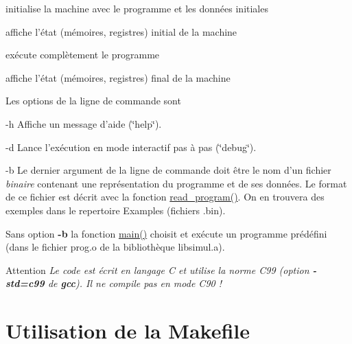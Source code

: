\begin{DoxyDescription}
\begin{DoxyItemize}
\item initialise la machine avec le programme et les données initiales


\item affiche l'état (mémoires, registres) initial de la machine


\item exécute complètement le programme


\item affiche l'état (mémoires, registres) final de la machine 
\end{DoxyItemize}

\-Les options de la ligne de commande sont 
\begin{DoxyDescription}
\item[-\/h ]\-Affiche un message d'aide (\char`\"{}help\char`\"{}).


\item[-\/d ]\-Lance l'exécution en mode interactif pas à pas (\char`\"{}debug\char`\"{}).


\item[-\/b ]\-Le dernier argument de la ligne de commande doit être le nom d'un fichier {\itshape binaire\/} contenant une représentation du programme et de ses données. \-Le format de ce fichier est décrit avec la fonction \hyperlink{machine_8h_ac59b88844961c2479108151e24dd555a}{read\-\_\-program()}. \-On en trouvera des exemples dans le repertoire \-Examples (fichiers {\ttfamily }.bin).

\-Sans option {\bfseries -\/b} la fonction \hyperlink{test__simul_8c_a0ddf1224851353fc92bfbff6f499fa97}{main()} choisit et exécute un programme prédéfini (dans le fichier {\ttfamily prog.\-o} de la bibliothèque {\ttfamily libsimul.\-a}).






\end{DoxyDescription}

\begin{DoxyAttention}{\-Attention}
{\itshape \-Le code est écrit en langage \-C et utilise la norme \-C99 (option {\bfseries -\/std=c99} de {\bfseries gcc}). \-Il ne compile pas en mode \-C90 !\/}
\end{DoxyAttention}

\end{DoxyDescription}\hypertarget{index_make}{}\section{\-Utilisation de la Makefile}\label{index_make}

